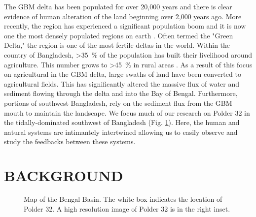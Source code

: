 \documentclass{wscpaperproc}
\theoremstyle{wsc}
\begin{document}
The GBM delta has been populated for over 20,000 years and there is clear evidence of human alteration of the land beginning over 2,000 years ago. More recently, the region has experienced a significant population boom and it is now one the most densely populated regions on earth \cite{bangladeshbureauofstatistics2011PopulationHousing2011}. Often termed the "Green Delta," the region is one of the most fertile deltas in the world. Within the country of Bangladesh, \SI{>35}{\percent} of the population has built their livelihood around agriculture. This number grows to \SI{>45}{\percent} in rural areas \cite{bangladeshbureauofstatisticsReportHouseholdIncome2010}. As a result of this focus on agricultural in the GBM delta, large swaths of land have been converted to agricultural fields. This has significantly altered the massive flux of water and sediment flowing through the delta and into the Bay of  Bengal. Furthermore, portions of southwest Bangladesh, rely on the sediment flux from the GBM mouth to maintain the landscape. We focus much of our research on Polder 32 in the tidally-dominated southwest of Bangladesh (Fig. \ref{fig:map}). Here, the human and natural systems are intimantely intertwined allowing us to easily observe and study the feedbacks between these systems.

\section{BACKGROUND}

\begin{figure}
	\caption[Map of the Bengal Basin]{\label{fig:map} Map of the Bengal Basin. The white box indicates the location of Polder 32. A high resolution image of Polder 32 is in the right inset.}
\end{figure}
\end{document}
